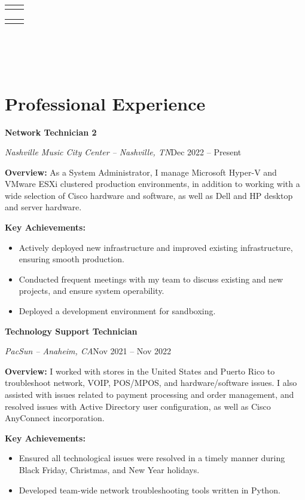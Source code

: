 \documentclass[a4paper]{article}
\makeatletter
\renewcommand{\maketitle}{
  \begin{widebox}
    {\huge\bfseries\textsf\theauthor} \\
    \medskip{}
    \begin{tabular}{@{}c|c@{}}
        \faIcon{linkedin} \textsf{\applinkedinurl{}} & \faIcon{github} \textsf{\appgithuburl{}}
    \end{tabular}
    \begin{tabular}{@{}c|c@{}}
        \faIcon{mobile} \textsf{\appcellphone{}} & \faIcon{envelope} \textsf{\appemail{}}
    \end{tabular} \\
    \medskip{}
    \faIcon{home} \textsf{\appaddresslineone{}} \\
    \textsf{\appaddresslinetwo{}} \\
    \textsf{\appaddresslinethree{}}
  \end{widebox}
}
\makeatother
\begin{document}
\author{\textsf{\appfirstname{} \applastname{}}}

\maketitle

\section{Professional Experience}
\begin{minipage}{\textwidth}
\textbf{Network Technician 2}\par
\textit{Nashville Music City Center -- Nashville, TN}\hfill Dec 2022 -- Present

\medskip
\textbf{Overview:} As a System Administrator, I manage Microsoft Hyper-V and VMware ESXi clustered production environments, in addition to working with a wide selection of Cisco hardware and software, as well as Dell and HP desktop and server hardware.

\medskip
\textbf{Key Achievements:} 
\begin{itemize}
    \item Actively deployed new infrastructure and improved existing infrastructure, ensuring smooth production.
    \item Conducted frequent meetings with my team to discuss existing and new projects, and ensure system operability.
    \item Deployed a development environment for sandboxing.
\end{itemize}
\end{minipage}

\vspace{10pt}
\begin{minipage}{\textwidth}
\textbf{Technology Support Technician}\par
\textit{PacSun -- Anaheim, CA}\hfill Nov 2021 -- Nov 2022

\medskip
\textbf{Overview:} I worked with stores in the United States and Puerto Rico to troubleshoot network, VOIP, POS/MPOS, and hardware/software issues. I also assisted with issues related to payment processing and order management, and resolved issues with Active Directory user configuration, as well as Cisco AnyConnect incorporation.

\medskip
\textbf{Key Achievements:}
\begin{itemize}
    \item Ensured all technological issues were resolved in a timely manner during Black Friday, Christmas, and New Year holidays.
    \item Developed team-wide network troubleshooting tools written in Python.
\end{itemize}
\end{minipage}
\end{document}
